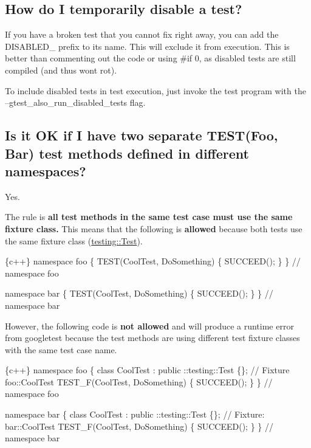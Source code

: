 \subsection*{How do I temporarily disable a test?}

If you have a broken test that you cannot fix right away, you can add the D\+I\+S\+A\+B\+L\+E\+D\+\_\+ prefix to its name. This will exclude it from execution. This is better than commenting out the code or using \#if 0, as disabled tests are still compiled (and thus won\textquotesingle{}t rot).

To include disabled tests in test execution, just invoke the test program with the --gtest\+\_\+also\+\_\+run\+\_\+disabled\+\_\+tests flag.

\subsection*{Is it OK if I have two separate {\ttfamily T\+E\+S\+T(\+Foo, Bar)} test methods defined in different namespaces?}

Yes.

The rule is {\bfseries all test methods in the same test case must use the same fixture class.} This means that the following is {\bfseries allowed} because both tests use the same fixture class ({\ttfamily \hyperlink{classtesting_1_1Test}{testing\+::\+Test}}).


\begin{DoxyCode}
\{c++\}
namespace foo \{
TEST(CoolTest, DoSomething) \{
  SUCCEED();
\}
\}  // namespace foo

namespace bar \{
TEST(CoolTest, DoSomething) \{
  SUCCEED();
\}
\}  // namespace bar
\end{DoxyCode}


However, the following code is {\bfseries not allowed} and will produce a runtime error from googletest because the test methods are using different test fixture classes with the same test case name.


\begin{DoxyCode}
\{c++\}
namespace foo \{
class CoolTest : public ::testing::Test \{\};  // Fixture foo::CoolTest
TEST\_F(CoolTest, DoSomething) \{
  SUCCEED();
\}
\}  // namespace foo

namespace bar \{
class CoolTest : public ::testing::Test \{\};  // Fixture: bar::CoolTest
TEST\_F(CoolTest, DoSomething) \{
  SUCCEED();
\}
\}  // namespace bar
\end{DoxyCode}
 